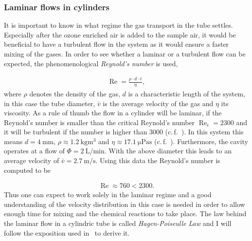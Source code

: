 \subsubsection{Laminar flows in cylinders}
\label{sec:cylinder}

It is important to know in what regime the gas transport in the tube
settles. Especially after the ozone enriched air is added to the
sample air, it would be beneficial to have a turbulent flow in the
system as it would ensure a faster mixing of the gases. In order to
see whether a laminar or a turbulent flow can be expected, the
phenomenological \emph{Reynold's number} is used,

\begin{align*}
  \operatorname{Re} = \frac{\rho \cdot d \cdot \bar v}{\eta},
\end{align*}
where $\rho$ denotes the density of the gas, $d$ is a characteristic
length of the system, in this case the tube diameter, $\bar v$ is the
average velocity of the gas and $\eta$ its viscosity. As a rule of
thumb the flow in a cylinder will be laminar, if the Reynold's number
is smaller than the critical Reynold's number
$\operatorname{Re}_{\text{c}} = 2300$ and it will be turbulent if the
number is higher than $3000$ (c.\,f.~\cite{maschbau}). In this system
this means $d = \SI{4}{\milli\meter}$,
$\rho \approx \SI{1.2}{\kilo\gram\cubic\meter}$ and
$\eta \approx \SI{17.1}{\micro\pascal\second}$
(c.\,f.~\cite{maschbau}). Furthermore, the cavity operates at a flow
of $\Phi = \SI{2}{\liter\per\minute}$. With the above diameter this
leads to an average velocity of
$\bar v = \SI{2.7}{\meter\per\second}$. Using this data the Reynold's
number is computed to be

\begin{align*}
  \operatorname{Re} \approx 760 < 2300.
\end{align*}
Thus one can expect to work solely in the laminar regime and a good
understanding of the velocity distribution in this case is needed in
order to allow enough time for mixing and the chemical reactions to
take place. The law behind the laminar flow in a cylindric tube is
called \emph{Hagen-Poiseulle Law} and I will follow the exposition used
in~\cite{gerthsen} to derive it.

